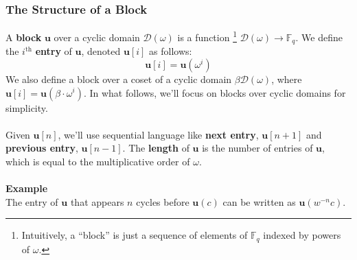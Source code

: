 \documentclass[10pt,letterpaper,titlepage]{article}
\newcommand{\GF}[1]{\mathbb{F}_{#1}}
\newcommand{\w}[0]{\omega}
\newcommand{\D}[0]{\mathcal{D}}
\theoremstyle{definition}
\begin{document}
\begin{appendices}
\subsubsection{The Structure of a Block}
\label{defining block}
A \textbf{block} $\mathbf{u}$ over a cyclic domain $\D(\w)$ is a function%
\footnote{Intuitively, a ``block'' is just a sequence of elements of $\GF{q}$ indexed by powers of $\w$.} $\D(\w)\to\GF{q}$. 
We define the $i^\text{th}$ \textbf{entry} of $\mathbf{u}$, denoted $\mathbf{u}[i]$ as follows: \[\mathbf{u}[i]=\mathbf{u}(\w^i)\]
We also define a block over a coset of a cyclic domain $\beta\mathcal{D}(\w)$, where $\mathbf{u}[i]=\mathbf{u}(\beta\cdot\w^i)$. 
In what follows, we'll focus on blocks over cyclic domains for simplicity. \\
\\Given $\mathbf{u}[n]$, we'll use sequential language like \textbf{next entry}, $\mathbf{u}[n+1]$ and \textbf{previous entry}, $\mathbf{u}[n-1]$. 
The \textbf{length} of $\mathbf{u}$ is the number of entries of $\mathbf{u}$, which is equal to the multiplicative order of $\w$.\\
\\
\textbf{Example}\\
The entry of $\mathbf{u}$ that appears $n$ cycles before $\mathbf{u}(c)$ can be written as $\mathbf{u}(w^{-n}c)$. \\

\end{appendices}
\end{document}
